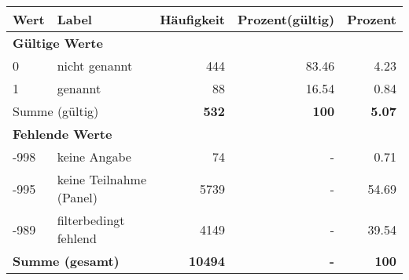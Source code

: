      \begin{longtable}{lXrrr}
     \toprule
     \textbf{Wert} & \textbf{Label} & \textbf{Häufigkeit} & \textbf{Prozent(gültig)} & \textbf{Prozent} \\
     \endhead
     \midrule
     \multicolumn{5}{l}{\textbf{Gültige Werte}}\\

     0 &
     \multicolumn{1}{X}{ nicht genannt   } &


       \num{444} &
       \num[round-mode=places,round-precision=2]{83.46} &
         \num[round-mode=places,round-precision=2]{4.23} \\

     1 &
     \multicolumn{1}{X}{ genannt   } &


       \num{88} &
       \num[round-mode=places,round-precision=2]{16.54} &
         \num[round-mode=places,round-precision=2]{0.84} \\
     \midrule
     \multicolumn{2}{l}{Summe (gültig)} &
       \textbf{\num{532}} &
     \textbf{\num{100}} &
       \textbf{\num[round-mode=places,round-precision=2]{5.07}} \\
     \multicolumn{5}{l}{\textbf{Fehlende Werte}}\\
       -998 &
       keine Angabe &
         \num{74} &
        - &
         \num[round-mode=places,round-precision=2]{0.71} \\
       -995 &
       keine Teilnahme (Panel) &
         \num{5739} &
        - &
         \num[round-mode=places,round-precision=2]{54.69} \\
       -989 &
       filterbedingt fehlend &
         \num{4149} &
        - &
         \num[round-mode=places,round-precision=2]{39.54} \\
     \midrule
     \multicolumn{2}{l}{\textbf{Summe (gesamt)}} &
          \textbf{\num{10494}} &
        \textbf{-} &
        \textbf{\num{100}} \\
     \bottomrule
     \end{longtable}
     

